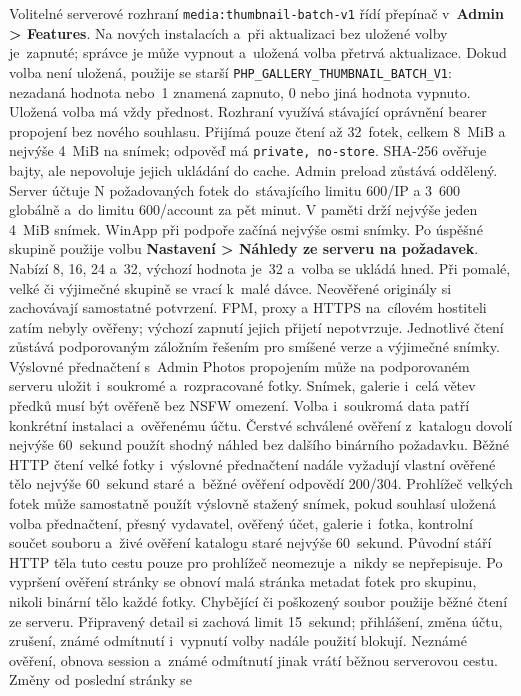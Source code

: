 \documentclass[11pt,a4paper]{article}
\newcommand{\ui}[1]{\textbf{#1}}
\newcommand{\codeword}[1]{\nolinkurl{#1}}
\begin{document}
Volitelné serverové rozhraní \codeword{media:thumbnail-batch-v1} řídí přepínač
v~\ui{Admin > Features}. Na nových instalacích a~při aktualizaci bez uložené
volby je~zapnuté; správce je může vypnout a~uložená volba přetrvá aktualizace.
Dokud volba není uložená, použije se starší
\codeword{PHP_GALLERY_THUMBNAIL_BATCH_V1}: nezadaná hodnota nebo~1 znamená
zapnuto, 0 nebo jiná hodnota vypnuto. Uložená volba má vždy přednost. Rozhraní
využívá stávající oprávnění bearer propojení bez nového souhlasu. Přijímá pouze čtení
až 32~fotek, celkem 8~MiB a nejvýše 4~MiB na snímek; odpověď má
\texttt{private, no-store}. SHA-256 ověřuje bajty, ale nepovoluje jejich
ukládání do cache. Admin preload zůstává oddělený. Server účtuje N požadovaných
fotek do~stávajícího limitu 600/IP a 3~600 globálně a~do limitu 600/account
za pět minut. V paměti drží nejvýše jeden 4~MiB snímek. WinApp při podpoře
začíná nejvýše osmi snímky. Po úspěšné skupině použije volbu
\ui{Nastavení > Náhledy ze serveru na požadavek}. Nabízí 8, 16, 24 a~32,
výchozí hodnota je~32 a~volba se ukládá hned. Při pomalé, velké či výjimečné
skupině se vrací k~malé dávce. Neověřené originály si zachovávají
samostatné potvrzení. FPM, proxy a HTTPS na~cílovém hostiteli zatím nebyly
ověřeny; výchozí zapnutí jejich přijetí nepotvrzuje.
Jednotlivé čtení zůstává podporovaným záložním řešením pro smíšené verze a
výjimečné snímky.
Výslovné přednačtení s~Admin Photos propojením může na podporovaném serveru
uložit i~soukromé a~rozpracované fotky. Snímek, galerie i~celá větev předků
musí být ověřeně bez NSFW omezení. Volba i~soukromá data patří konkrétní
instalaci a~ověřenému účtu. Čerstvé schválené ověření z~katalogu dovolí
nejvýše 60~sekund použít shodný náhled bez dalšího binárního požadavku.
Běžné HTTP čtení velké fotky i~výslovné přednačtení nadále vyžadují vlastní
ověřené tělo nejvýše 60~sekund staré a~běžné ověření odpovědí 200/304.
Prohlížeč velkých fotek může samostatně použít výslovně stažený snímek, pokud
souhlasí uložená volba přednačtení, přesný vydavatel, ověřený účet, galerie
i~fotka, kontrolní součet souboru a~živé ověření katalogu staré nejvýše
60~sekund. Původní stáří HTTP těla tuto cestu pouze pro prohlížeč neomezuje
a~nikdy se nepřepisuje. Po vypršení ověření stránky se obnoví malá stránka
metadat fotek pro skupinu, nikoli binární tělo každé fotky. Chybějící či
poškozený soubor použije běžné čtení ze serveru. Připravený detail si zachová
limit 15~sekund; přihlášení, změna účtu, zrušení, známé odmítnutí i~vypnutí
volby nadále použití blokují. Neznámé ověření, obnova session a~známé
odmítnutí jinak vrátí běžnou serverovou cestu. Změny od poslední stránky se
\end{document}
